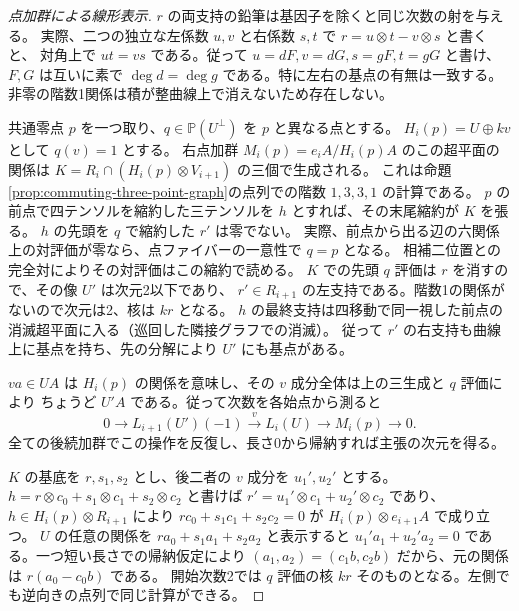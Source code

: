 \begin{proof}[点加群による線形表示]
$r$ の両支持の鉛筆は基因子を除くと同じ次数の射を与える。
実際、二つの独立な左係数 $u,v$ と右係数 $s,t$ で $r=u\otimes t-v\otimes s$ と書くと、
対角上で $ut=vs$ である。従って $u=dF,v=dG,s=gF,t=gG$ と書け、
$F,G$ は互いに素で $\deg d=\deg g$ である。特に左右の基点の有無は一致する。
非零の階数1関係は積が整曲線上で消えないため存在しない。

共通零点 $p$ を一つ取り、$q\in\mathbb P(U^\perp)$ を $p$ と異なる点とする。
$H_i(p)=U\oplus kv$ として $q(v)=1$ とする。
右点加群 $M_i(p)=e_iA/H_i(p)A$ のこの超平面の関係は
$K=R_i\cap(H_i(p)\otimes V_{i+1})$ の三個で生成される。
これは命題\ref{prop:commuting-three-point-graph}の点列での階数 $1,3,3,1$ の計算である。
$p$ の前点で四テンソルを縮約した三テンソルを $h$ とすれば、その末尾縮約が $K$ を張る。
$h$ の先頭を $q$ で縮約した $r'$ は零でない。
実際、前点から出る辺の六関係上の対評価が零なら、点ファイバーの一意性で $q=p$ となる。
相補二位置との完全対によりその対評価はこの縮約で読める。
$K$ での先頭 $q$ 評価は $r$ を消すので、その像 $U'$ は次元2以下であり、
$r'\in R_{i+1}$ の左支持である。階数1の関係がないので次元は2、核は $kr$ となる。
$h$ の最終支持は四移動で同一視した前点の消滅超平面に入る（巡回した隣接グラフでの消滅）。
従って $r'$ の右支持も曲線上に基点を持ち、先の分解により $U'$ にも基点がある。

$va\in UA$ は $H_i(p)$ の関係を意味し、その $v$ 成分全体は上の三生成と $q$ 評価により
ちょうど $U'A$ である。従って次数を各始点から測ると
\[
 0\longrightarrow L_{i+1}(U')(-1)\xrightarrow{\ v\ }
 L_i(U)\longrightarrow M_i(p)\longrightarrow0 .
\]
全ての後続加群でこの操作を反復し、長さ0から帰納すれば主張の次元を得る。

$K$ の基底を $r,s_1,s_2$ とし、後二者の $v$ 成分を $u_1',u_2'$ とする。
$h=r\otimes c_0+s_1\otimes c_1+s_2\otimes c_2$ と書けば
$r'=u_1'\otimes c_1+u_2'\otimes c_2$ であり、
$h\in H_i(p)\otimes R_{i+1}$ により $r c_0+s_1 c_1+s_2 c_2=0$ が $H_i(p)\otimes e_{i+1}A$ で成り立つ。
$U$ の任意の関係を $r a_0+s_1 a_1+s_2 a_2$ と表示すると
$u_1'a_1+u_2'a_2=0$ である。一つ短い長さでの帰納仮定により
$(a_1,a_2)=(c_1 b,c_2 b)$ だから、元の関係は $r(a_0-c_0 b)$ である。
開始次数2では $q$ 評価の核 $kr$ そのものとなる。左側でも逆向きの点列で同じ計算ができる。
\end{proof}

